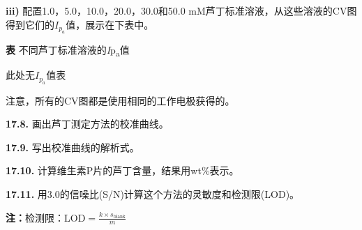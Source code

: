 \textbf{iii)} 配置1.0，5.0，10.0，20.0，30.0和50.0 mM芦丁标准溶液，从这些溶液的CV图得到它们的$I_{p_a}$值，展示在下表中。

\textbf{表} 不同芦丁标准溶液的\emph{I}p\textsubscript{a}值

此处无$I_{p_a}$值表

注意，所有的CV图都是使用相同的工作电极获得的。

\noindent\textbf{17.8.} 画出芦丁测定方法的校准曲线。

\noindent\textbf{17.9.} 写出校准曲线的解析式。

\noindent\textbf{17.10.} 计算维生素P片的芦丁含量，结果用wt\%表示。

\noindent\textbf{17.11.} 用3.0的信噪比(S/N)计算这个方法的灵敏度和检测限(LOD)。

\noindent\textbf{注：}检测限：$\mathrm{LOD}=\frac{k\times s_{\mathrm{blank}}}{m}$
